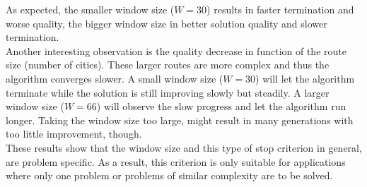 \noindent As expected, the smaller window size ($W = 30$) results in faster termination and worse quality, the bigger window size in better solution quality and slower termination. \\
Another interesting observation is the quality decrease in function of the route size (number of cities). These larger routes are more complex and thus the algorithm converges slower. A small window size ($W = 30$) will let the algorithm terminate while the solution is still improving slowly but steadily. A larger window size ($W = 66$) will observe the slow progress and let the algorithm run longer. Taking the window size too large, might result in many generations with too little improvement, though.\\
\newline
These results show that the window size and this type of stop criterion in general, are problem specific. As a result, this criterion is only suitable for applications where only one problem or problems of similar complexity are to be solved.


